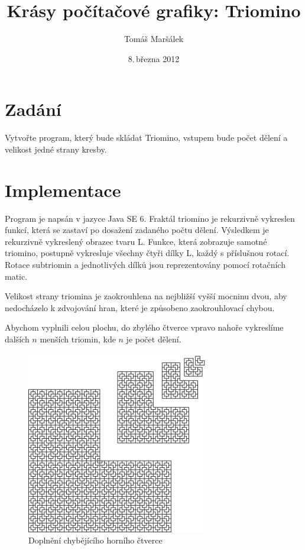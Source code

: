 \documentclass[11pt]{article}
\title{Krásy počítačové grafiky: Triomino}
\author{Tomáš Maršálek}
\date{8.\,března 2012}
\begin{document}
\maketitle

\section{Zadání}
Vytvořte program, který bude skládat Triomino, vstupem bude počet
dělení a velikost jedné strany kresby.

\section{Implementace}
Program je napsán v jazyce Java SE 6. Fraktál triomino je rekurzivně vykreslen
funkcí, která se zastaví po dosažení zadaného počtu dělení. Výsledkem je
rekurzivně vykreslený obrazec tvaru L.  Funkce, která zobrazuje samotné
triomino, postupně vykresluje všechny čtyři dílky L, každý s příslušnou rotací.
Rotace subtriomin a jednotlivých dílků jsou reprezentovány pomocí rotačních
matic.

Velikost strany triomina je zaokrouhlena na nejbližší vyšší mocninu dvou, aby
nedocházelo k zdvojování hran, které je způsobeno zaokrouhlovací chybou.

Abychom vyplnili celou plochu, do zbylého čtverce vpravo nahoře vykreslíme
dalších $n$ menších triomin, kde $n$ je počet dělení.

\begin{figure}[ht!]
\centering
	\includegraphics[width=8cm]{triomino_doplneni.png}
	\caption{Doplnění chybějícího horního čtverce}
\end{figure}
\end{document}
